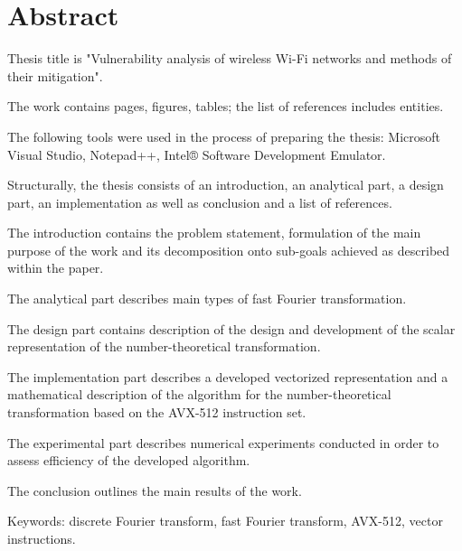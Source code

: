 \chapter*{Abstract}
Thesis title is "Vulnerability analysis of wireless Wi-Fi networks and methods of their mitigation".

The work contains \totalpagecount*{} pages, \totalfigurecount*{} figures, \totaltablecount*{} tables; the list of references includes \totalcitationcount*{} entities.

The following tools were used in the process of preparing the thesis: Microsoft Visual Studio, Notepad++, Intel® Software Development Emulator.

Structurally, the thesis consists of an introduction, an analytical part, a design part, an implementation as well as conclusion and a list of references.

The introduction contains the problem statement, formulation of the main purpose of the work and its decomposition onto sub-goals achieved as described within the paper.

The analytical part describes main types of fast Fourier transformation.

The design part contains description of the design and development of the scalar representation of the number-theoretical transformation.

The implementation part describes a developed vectorized representation and a mathematical description of the algorithm for the number-theoretical transformation based on the AVX-512 instruction set.

The experimental part describes numerical experiments conducted in order to assess efficiency of the developed algorithm.

The conclusion outlines the main results of the work.

Keywords: discrete Fourier transform, fast Fourier transform, AVX-512, vector instructions.

